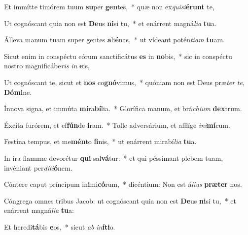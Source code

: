 \item Et immítte timórem tuum \textbf{su}per \textbf{gen}tes,~* quæ non ex\textit{qui}\textit{si}\textbf{é}\textbf{runt} te,
\item Ut cognóscant quia non est \textbf{De}us \textbf{ni}si tu,~* et enárrent magná\textit{li}\textit{a} \textbf{tu}a.
\item Álleva manum tuam super gentes \textbf{a}li\textbf{é}nas,~* ut vídeant potén\textit{ti}\textit{am} \textbf{tu}am.
\item Sicut enim in conspéctu eórum sanctificátus \textbf{es} in \textbf{no}bis,~* sic in conspéctu nostro magnificábe\textit{ris} \textit{in} \textbf{e}is,
\item Ut cognóscant te, sicut et \textbf{nos} co\textbf{gnó}vimus,~* quóniam non est Deus præ\textit{ter} \textit{te}, \textbf{Dó}\textbf{mi}ne.
\item Ínnova signa, et immúta \textbf{mi}ra\textbf{bí}lia.~* Glorífica manum, et brá\textit{chi}\textit{um} \textbf{dex}trum.
\item Éxcita furórem, et ef\textbf{fún}de \textbf{i}ram.~* Tolle adversárium, et afflíge \textit{in}\textit{i}\textbf{mí}cum.
\item Festína tempus, et me\textbf{mén}to \textbf{fi}nis,~* ut enárrent mirabí\textit{li}\textit{a} \textbf{tu}a.
\item In ira flammæ devorétur \textbf{qui} sal\textbf{vá}tur:~* et qui péssimant plebem tuam, invéniant per\textit{di}\textit{ti}\textbf{ó}nem.
\item Cóntere caput príncipum in\textbf{i}mi\textbf{có}rum,~* dicéntium: Non est á\textit{li}\textit{us} \textbf{præ}\textbf{ter} nos.
\item Cóngrega omnes tribus Jacob: ut cognóscant quia non est \textbf{De}us \textbf{ni}si tu,~* et enárrent magná\textit{li}\textit{a} \textbf{tu}a:
\item Et heredi\textbf{tá}bis \textbf{e}os,~* sicut \textit{ab} \textit{in}\textbf{í}\textbf{ti}o.
